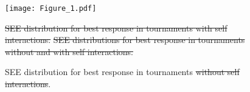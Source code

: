 \documentclass[fleqn,10pt]{wlscirep}
\providecommand{\DIFadd}[1]{{\protect\color{blue}\uwave{#1}}} %
\providecommand{\DIFdel}[1]{{\protect\color{red}\sout{#1}}}                      %
\providecommand{\DIFaddFL}[1]{\DIFadd{#1}} %
\providecommand{\DIFdelFL}[1]{\DIFdel{#1}} %
\providecommand{\DIFaddbeginFL}{} %
\providecommand{\DIFaddendFL}{} %
\providecommand{\DIFdelbeginFL}{} %
\providecommand{\DIFdelendFL}{} %
\begin{document}
\begin{table}[!htbp]
    \begin{center}
    \DIFdelbeginFL %
\DIFdelendFL \DIFaddbeginFL {}
    \DIFaddendFL \end{center}
    \caption{SSE of best response memory-one when \(N=2\)}\label{table:sserror_stats}
\end{table}

\begin{figure}[!htbp]
    \DIFdelbeginFL %
\DIFdelendFL \begin{center}
        \DIFdelbeginFL %
\DIFdelendFL \DIFaddbeginFL \texttt{[image: Figure\_1.pdf]}
    \DIFaddendFL \end{center}
    \caption{SEE distribution for best response in tournaments \DIFdelbeginFL \DIFdelFL{without self interactions}\DIFdelendFL \DIFaddbeginFL \DIFaddFL{with \(N=2\)}\DIFaddendFL .}\DIFdelbeginFL %
{%
\DIFdelFL{SEE distribution for best response in tournaments with self interactions.}}
{%
\DIFdelFL{SEE distributions for best response in tournaments without and with self interactions. }%
}%
\DIFdelendFL \label{fig:sse_distributions}
\end{figure}
\end{document}
